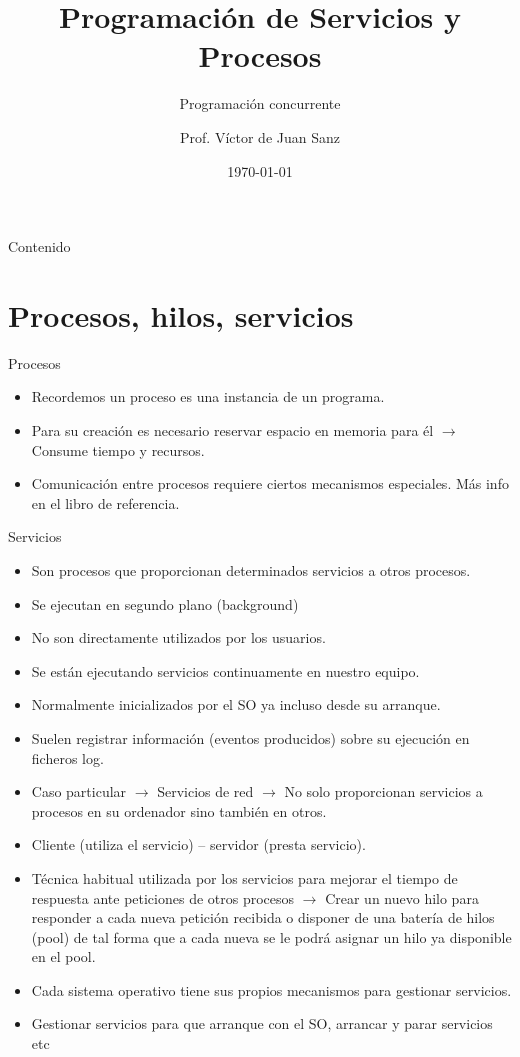 \documentclass{beamer}
\title{Programación de Servicios y Procesos}
\subtitle{Programación concurrente}
\author{Prof. Víctor de Juan Sanz}
\institute{Colegio Santo Domingo Savio}
\date{\today}
\begin{document}
\begin{frame}
    \titlepage
\end{frame}

\begin{frame}{Contenido}
    \tableofcontents
\end{frame}

\section{Procesos, hilos, servicios}
\begin{frame}{Procesos}
\begin{itemize}

\item Recordemos un proceso es una instancia de un programa.
\item Para su creación es necesario reservar espacio en memoria para él $\to$ Consume tiempo y
recursos.
\item Comunicación entre procesos requiere ciertos mecanismos especiales. Más info en el libro de referencia.

\end{itemize}
\end{frame}

\begin{frame}{Servicios}
\begin{itemize}
\item Son procesos que proporcionan determinados servicios a otros procesos.
\item Se ejecutan en segundo plano (background)
\item No son directamente utilizados por los usuarios.
\item Se están ejecutando servicios continuamente en nuestro equipo.
\item Normalmente inicializados por el SO ya incluso desde su arranque.
\item Suelen registrar información (eventos producidos) sobre su ejecución
en ficheros log.
\item Caso particular $\to$ Servicios de red $\to$ No solo proporcionan servicios
a procesos en su ordenador sino también en otros.
\item Cliente (utiliza el servicio) – servidor (presta servicio).
\item Técnica habitual utilizada por los servicios para mejorar el tiempo de
respuesta ante peticiones de otros procesos $\to$ Crear un nuevo hilo
para responder a cada nueva petición recibida o disponer de una
batería de hilos (pool) de tal forma que a cada nueva se le podrá
asignar un hilo ya disponible en el pool.
\item Cada sistema operativo tiene sus propios mecanismos para gestionar
servicios.
\item Gestionar servicios para que arranque con el SO, arrancar y parar servicios
etc
\end{itemize}
\end{frame}
\end{document}
